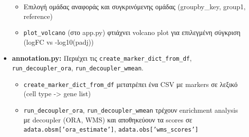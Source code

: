 \documentclass[12pt, a4paper]{article}
\begin{document}
\begin{itemize}
        \begin{itemize}
            \item Επιλογή ομάδας αναφοράς και συγκρινόμενης ομάδας (groupby\_key, group1, reference)
            \item \texttt{plot\_volcano} (στο app.py) φτιάχνει volcano plot για επιλεγμένη σύγκριση (logFC vs -log10(padj))
        \end{itemize}
    \item \textbf{annotation.py:} Περιέχει τις \texttt{create\_marker\_dict\_from\_df}, \texttt{run\_decoupler\_ora}, \texttt{run\_decoupler\_wmean}.
        \begin{itemize}
            \item \texttt{create\_marker\_dict\_from\_df} μετατρέπει ένα CSV με markers σε λεξικό (cell type -> gene list)
            \item \texttt{run\_decoupler\_ora}, \texttt{run\_decoupler\_wmean} τρέχουν enrichment analysis με decoupler (ORA, WMS) και αποθηκεύουν τα scores σε \texttt{adata.obsm['ora\_estimate']}, \texttt{adata.obs['wms\_scores']}
        \end{itemize}
\end{itemize}
\end{document}
